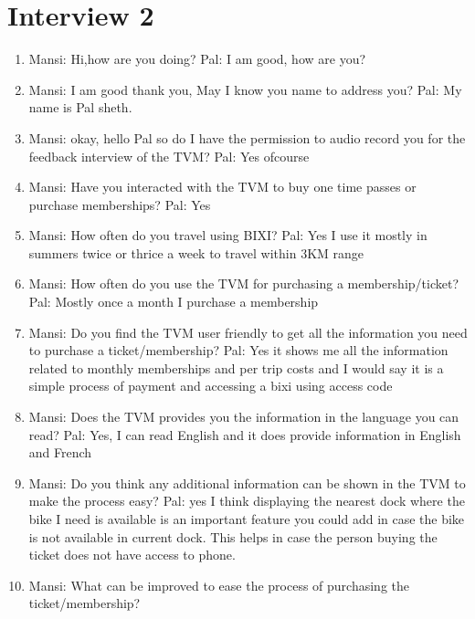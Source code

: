 \section{Interview 2}
\begin{enumerate}
    \item Mansi: Hi,how are you doing?
    \newline Pal: I am good, how are you?
    \item Mansi: I am good thank you, May I know you name to address you?
    \newline Pal: My name is Pal sheth.
    \item Mansi: okay, hello Pal so do I have the permission to audio record you for the feedback interview of the TVM?
    \newline Pal: Yes ofcourse
    \item Mansi: Have you interacted with the TVM to buy one time passes or purchase memberships?
    \newline Pal: Yes
    \item Mansi: How often do you travel using BIXI?
    \newline Pal: Yes I use it mostly in summers twice or thrice a week to travel within 3KM range 
    \item Mansi: How often do you use the TVM for purchasing a membership/ticket?
    \newline Pal: Mostly once a month I purchase a membership 
    \item Mansi: Do you find the TVM user friendly to get all the information you need to purchase a ticket/membership?
    \newline Pal: Yes it shows me all the information related to monthly memberships and per trip costs and I would say it is a simple process of payment and accessing a bixi using access code
    \item Mansi: Does the TVM provides you the information in the language you can read?
    \newline Pal: Yes, I can read English and it does provide information in English and French
    \item Mansi: Do you think any additional information can be shown in the TVM to make the process easy?
    \newline Pal: yes I think displaying the nearest dock where the bike I need is available is an important feature you could add in case the bike is not available in current dock. This helps in case the person buying the ticket does not have access to phone.
    \item Mansi: What can be improved to ease the process of purchasing the ticket/membership?

\end{enumerate}

